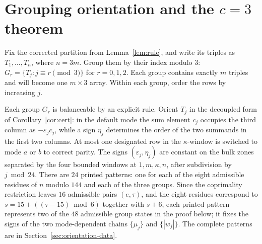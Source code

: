 \section{Grouping orientation and the \texorpdfstring{$c=3$}{c=3} theorem}\label{sec:proof}

Fix the corrected partition from Lemma~\ref{lem:rule}, and write its triples as
$T_1,\dots,T_n$, where $n=3m$. Group them by their index modulo $3$:
$G_r=\{T_j:j\equiv r\pmod3\}$ for $r=0,1,2$. Each group contains exactly $m$ triples and will
become one $m\times3$ array. Within each group, order the rows by increasing $j$.

\begin{lemma}\label{lem:orient}
Each group $G_r$ is balanceable by an explicit rule. Orient $T_j$ in the decoupled form of
Corollary~\ref{cor:cert}: in the default mode the sum element $c_j$ occupies the third column as
$-\varepsilon_jc_j$, while a sign $\eta_j$ determines the order of the two summands in the first two
columns. At most one designated row in the $\kappa$-window is switched to mode $a$ or $b$ to correct
parity. The signs $(\varepsilon_j,\eta_j)$ are constant on the bulk zones separated by the four
bounded windows at $1,m,\kappa,n$, after subdivision by $j\bmod24$. There are $24$ printed patterns:
one for each of the eight admissible residues of $n$ modulo $144$ and each of the three groups.
Since the coprimality restriction leaves $16$ admissible pairs $(e,\tau)$, and the eight residues
correspond to $s=15+((\tau-15)\bmod6)$ together with $s+6$, each printed pattern represents two of
the $48$ admissible group states in the proof below; it fixes the
signs of the two mode-dependent chains $\{\mu_j\}$ and $\{|w_j|\}$. The complete patterns are in
Section~\ref{sec:orientation-data}.
\end{lemma}
